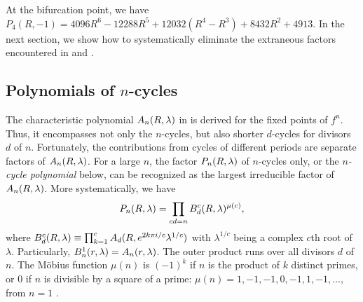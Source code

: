 \documentclass{ws-ijbc}
\begin{document}
%
At the bifurcation point, %
we have $P_4(R, -1)
 = 4096 R^6 - 12288 R^5 + 12032 (R^4 - R^3)
  + 8432 R^2 + 4913$.
%
%
%
In the next section, we show how to systematically eliminate
the extraneous factors encountered in  and .





\subsection{\label{sec:primfac}Polynomials of $n$-cycles}


The characteristic polynomial $A_n(R, \lambda)$ in 
  is derived for the fixed points of $f^n$.
Thus, it encompasses not only the $n$-cycles,
  but also shorter $d$-cycles for divisors $d$ of $n$.
%
Fortunately, the contributions from cycles of different periods
  are separate factors of $A_n(R, \lambda)$.
For a large $n$,
  the factor $P_n(R, \lambda)$ of $n$-cycles only,
  or the \emph{$n$-cycle polynomial} below,
  can be recognized
  as the largest irreducible factor of $A_n(R, \lambda)$.
%
More systematically, we have
  \begin{equation}
    P_n(R, \lambda)
    = \prod_{cd = n} B_d^c(R, \lambda)^{\mu(c)},
  \label{eq:primfac}
  \end{equation}
where
  $B_d^c(R, \lambda) \equiv \prod_{k=1}^c A_{d}(R, e^{2k\pi i/c} \lambda^{1/c})$
  with
  $\lambda^{1/c}$ being a complex $c$th root of $\lambda$.
Particularly, $B_n^1(r, \lambda) = A_n(r, \lambda)$.
The outer product runs over all divisors $d$ of $n$.
%
%
%
The M\"obius function $\mu(n)$ is $(-1)^k$
  if $n$ is the product of $k$ distinct primes,
  or 0 if $n$ is divisible by a square of a prime:
$\mu(n) = 1, -1, -1, 0, -1, 1, -1, \ldots,$
  from $n = 1$
 \cite{hardy}.
%
\end{document}
